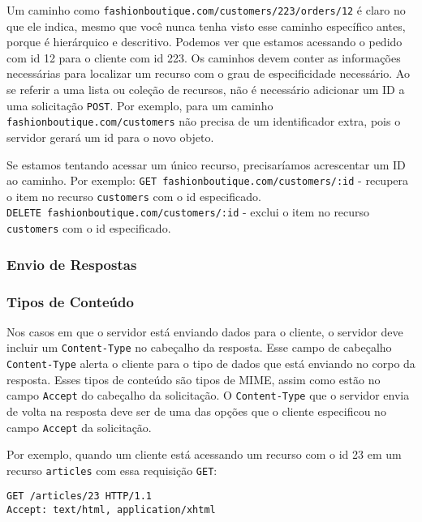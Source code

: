 \documentclass[12pt, a4paper
]{article}
\begin{document}
Um caminho como \texttt{fashionboutique.com/customers/223/orders/12} é
claro no que ele indica, mesmo que você nunca tenha visto esse caminho
específico antes, porque é hierárquico e descritivo. Podemos ver que
estamos acessando o pedido com id 12 para o cliente com id 223. Os
caminhos devem conter as informações necessárias para localizar um
recurso com o grau de especificidade necessário. Ao se referir a uma
lista ou coleção de recursos, não é necessário adicionar um ID a uma
solicitação \texttt{POST}. Por exemplo, para um caminho \texttt{fashionboutique.com/customers}
não precisa de um identificador extra, pois o servidor
gerará um id para o novo objeto.

Se estamos tentando acessar um único recurso, precisaríamos acrescentar
um ID ao caminho. Por exemplo:
\texttt{GET\ fashionboutique.com/customers/:id} - recupera o item no
recurso \texttt{customers} com o id especificado.
\texttt{DELETE\ fashionboutique.com/customers/:id} - exclui o item no
recurso \texttt{customers} com o id especificado.

\hypertarget{envio-de-respostas}{%
\subsubsection{Envio de Respostas}\label{envio-de-respostas}}

\hypertarget{tipos-de-conteuxfado}{%
\subsubsection{Tipos de Conteúdo}\label{tipos-de-conteuxfado}}

Nos casos em que o servidor está enviando dados para o
cliente, o servidor deve incluir um \texttt{Content-Type} no cabeçalho
da resposta. Esse campo de cabeçalho \texttt{Content-Type} alerta o
cliente para o tipo de dados que está enviando no corpo da resposta.
Esses tipos de conteúdo são tipos de MIME, assim como estão no campo
\texttt{Accept} do cabeçalho da solicitação. O \texttt{Content-Type} que
o servidor envia de volta na resposta deve ser de uma das opções que o
cliente especificou no campo \texttt{Accept} da solicitação.

Por exemplo, quando um cliente está acessando um recurso com o id 23 em
um recurso \texttt{articles} com essa requisição \texttt{GET}:

\begin{verbatim}
GET /articles/23 HTTP/1.1
Accept: text/html, application/xhtml
\end{verbatim}
\end{document}
